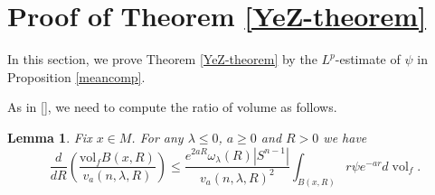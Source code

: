 \documentclass[11pt]{amsart}
\numberwithin{equation}{section}
\newtheorem{lemma}[theorem]{Lemma}
\newcommand{\vol}{\mathrm{vol}}
\begin{document}
\section{Proof of Theorem \ref{YeZ-theorem} }\label{sec4}

In this section, we prove Theorem  \ref{YeZ-theorem} by the $L^{p}$-estimate of $\psi$  in Proposition \ref{meancomp}.

As in [\cite{PW, Wu}], we need to compute the ratio of volume as follows.

\begin{lemma}\label{volratio}
	Fix $x\in M$. For any $\lambda\leq 0$, $a\geq 0$ and $R>0$ we have
	\begin{equation}
	\frac{d}{dR}\left(\frac{\vol_fB(x,R)}{v_a(n,\lambda,R)}\right)\leq \frac{e^{2aR}\omega_\lambda(R)|S^{n-1}|}{v_a(n,\lambda,R)^2}\int_{B(x,R)}r\psi  e^{-ar} d\operatorname{vol}_f.\label{volratio-ineq}
	\end{equation}
\end{lemma}
\end{document}
